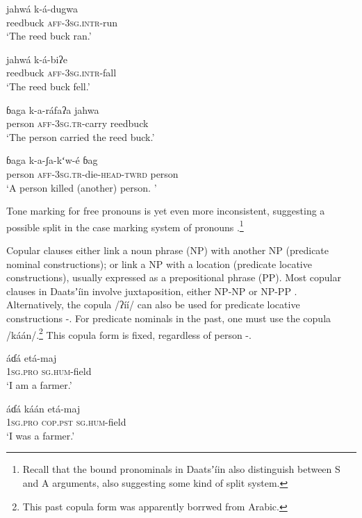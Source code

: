 \documentclass[output=paper]{langsci/langscibook}
\begin{document}
\ea\label{ex:ahlandc:69}
\gll
jahwá        k-á-dugwa \\
reedbuck  \textsc{aff-3sg.intr}{}-run\\
\glt
‘The reed buck ran.’
\z

\ea\label{ex:ahlandc:70}
\gll
jahwá    k-á-biʔe\\
reedbuck    \textsc{aff-3sg.intr}{}-fall\\
\glt
‘The reed buck fell.’
\z

\ea\label{ex:ahlandc:71}
\gll
ɓaga     k-a-ráfaʔa     jahwa\\
person   \textsc{aff-3sg.tr}{}-carry  reedbuck \\
\glt
‘The person carried the reed buck.’
\z

\ea\label{ex:ahlandc:72}
\gll
ɓaga     k-a-ʃa-kʻw-é  ɓag \\
person \textsc{aff-3sg.tr}{}-die-\textsc{head-twrd}   person\\
\glt
‘A person killed (another) person. ’
\z

Tone marking for free pronouns is yet even more inconsistent, suggesting a possible split in the case marking system of pronouns \citep{Kelly2014}.\footnote{Recall that the bound pronominals in Daatsʼíin also distinguish between S and A arguments, also suggesting some kind of split system.} 

Copular clauses either link a noun phrase (NP) with another NP (predicate nominal constructions); or link a NP with a location (predicate locative constructions), usually expressed as a prepositional phrase (PP). Most copular clauses in Daatsʼíin involve juxtaposition, either NP-NP  or NP-PP . Alternatively, the copula /ʔíí/ can also be used for predicate locative constructions -. For predicate nominals in the past, one must use the copula /káán/.\footnote{This past copula form was apparently borrwed from Arabic.} This copula form is fixed, regardless of person -.

\ea\label{ex:ahlandc:73}
\gll
áɗá    etá-maj \\
\textsc{1sg.pro}    \textsc{sg.hum}{}-field\\
\glt
‘I am a farmer.’
\z

\ea\label{ex:ahlandc:74}
\gll
áɗá  káán  etá-maj \\
\textsc{1sg.pro}    \textsc{cop.pst} \textsc{sg.hum}{}-field \\
\glt
‘I was a farmer.’
\z
\end{document}
